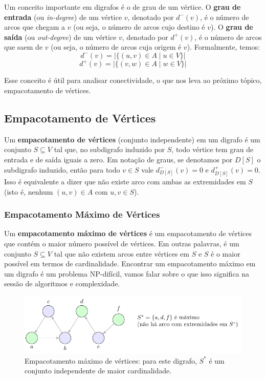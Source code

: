 Um conceito importante em digrafos é o de grau de um vértice. O \textbf{grau de entrada} (ou \emph{in-degree}) de um vértice \(v\), denotado por \(d^-(v)\), é o número de arcos que chegam a \(v\) (ou seja, o número de arcos cujo destino é \(v\)). O \textbf{grau de saída} (ou \emph{out-degree}) de um vértice \(v\), denotado por \(d^+(v)\), é o número de arcos que saem de \(v\) (ou seja, o número de arcos cuja origem é \(v\)). Formalmente, temos:
\[d^-(v) = |\{(u, v) \in A \mid u \in V\}|\]
\[d^+(v) = |\{(v, w) \in A \mid w \in V\}|\]


Esse conceito é útil para analisar conectividade, o que nos leva ao próximo tópico, empacotamento de vértices.

\subsection{Empacotamento de Vértices}
Um \textbf{empacotamento de vértices} (conjunto independente) em um digrafo é um conjunto \(S\subseteq V\) tal que, no subdigrafo induzido por \(S\), todo vértice tem grau de entrada e de saída iguais a zero. Em notação de graus, se denotamos por \(D[S]\) o subdigrafo induzido, então para todo \(v\in S\) vale \(d^-_{D[S]}(v)=0\) e \(d^+_{D[S]}(v)=0\). Isso é equivalente a dizer que não existe arco com ambas as extremidades em \(S\) (isto é, nenhum \((u,v)\in A\) com \(u,v\in S\)).

\subsubsection{Empacotamento Máximo de Vértices}

Um \textbf{empacotamento máximo de vértices} é um empacotamento de vértices que contém o maior número possível de vértices. Em outras palavras, é um conjunto \(S\subseteq V\) tal que não existem arcos entre vértices em \(S\) e \(S\) é o maior possível em termos de cardinalidade. Encontrar um empacotamento máximo em um digrafo é um problema NP-difícil, vamos falar sobre o que isso significa na sessão de algoritmos e complexidade.


\begin{figure}[H]
	\centering
	\includegraphics[width=0.9\linewidth]{figures/fig_empacotamento_max.pdf}

	\caption{Empacotamento máximo de vértices: para este digrafo, $S^{*}$ é um conjunto independente de maior cardinalidade.}
	\label{fig:empacotamento-max}
\end{figure}



